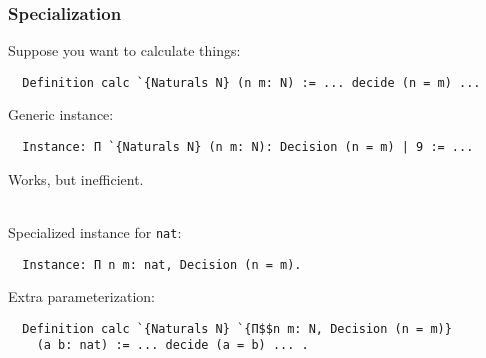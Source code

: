 \documentclass{beamer}
\begin{document}
\begin{frame}[fragile]
\frametitle{Specialization} %

Suppose you want to calculate things:

\begin{lstlisting}
  Definition calc `{Naturals N} (n m: N) := ... decide (n = m) ...
\end{lstlisting}
Generic instance:
\begin{lstlisting}
  Instance: Π `{Naturals N} (n m: N): Decision (n = m) | 9 := ...
\end{lstlisting}
Works, but inefficient.

\ \\
\pause
Specialized instance for \lstinline|nat|:
\begin{lstlisting}
  Instance: Π n m: nat, Decision (n = m).
\end{lstlisting}
Extra parameterization:
\begin{lstlisting}
  Definition calc `{Naturals N} `{Π$$n m: N, Decision (n = m)}
    (a b: nat) := ... decide (a = b) ... .
\end{lstlisting}
\end{frame}
\end{document}
